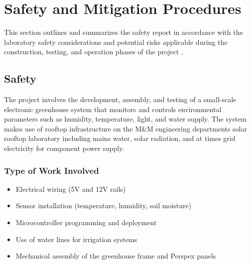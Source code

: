 \chapter{Safety and Mitigation Procedures}\label{chap:safety}

This section outlines and summarizes the safety report in accordance with the laboratory safety considerations and potential risks applicable during the construction, testing, and operation phases of the project .

\section{Safety}

The project involves the development, assembly, and testing of a small-scale electronic greenhouse system that monitors and controls environmental parameters such as humidity, temperature, light, and water supply. The system makes use of rooftop infrastructure on the M\&M engineering departments solar rooftop laboratory including mains water, solar radiation, and at times grid electricity for component power supply.

\subsection{Type of Work Involved}
\begin{itemize}
	\item Electrical wiring (5V and 12V rails)
	\item Sensor installation (temperature, humidity, soil moisture)
	\item Microcontroller programming and deployment
	\item Use of water lines for irrigation systems
	\item Mechanical assembly of the greenhouse frame and Perspex panels
\end{itemize}

